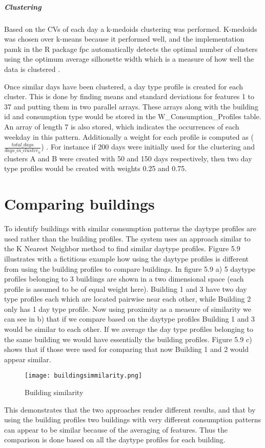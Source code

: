 \subparagraph{Clustering}Based on the CVs of each day a k-medoids clustering was performed. K-medoids was chosen over k-means because it performed well, and the implementation pamk in the R package fpc automatically detects the optimal number of clusters using the optimum average silhouette width which is a measure of how well the data is clustered \cite{PeterJRousseeuw}. 

Once similar days have been clustered, a day type profile is created for each cluster. This is done by finding means and standard deviations for features 1 to 37 and putting them in two parallel arrays. These arrays along with the building id and consumption type would be stored in the W\_Consumption\_Profiles table. An array of length 7 is also stored, which indicates the occurrences of each weekday in this pattern. Additionally a weight for each profile is computed as ($\frac{total\_days}{days\_in\_cluster_n}$)	. For instance if 200 days were initially used for the clustering and clusters A and B were created with 50 and 150 days respectively, then two day type profiles would be created with weights 0.25 and 0.75.
\section{Comparing buildings}
To identify buildings with similar consumption patterns the daytype profiles are used rather than the building profiles. The system uses an approach similar to the K Nearest Neighbor method to find similar daytype profiles. Figure 5.9 illustrates with a fictitious example how using the daytype profiles is different from using the building profiles to compare buildings. In figure 5.9 a) 5 daytype profiles belonging to 3 buildings are shown in a two dimensional space (each profile is assumed to be of equal weight here). Building 1 and 3 have two day type profiles each which are located pairwise near each other, while Building 2 only has 1 day type profile. Now using proximity as a measure of similarity we can see in b) that if we compare based on the daytype profiles Building 1 and 3 would be similar to each other. If we average the day type profiles belonging to the same building we would have essentially the building profiles. Figure 5.9 c) shows that if those were used for comparing that now Building 1 and 2 would appear similar. 
\begin{figure}
\begin{center}
\texttt{[image: buildingsimmilarity.png]}
\end{center}
\caption{Building similarity}
\end{figure}
This demonstrates that the two approaches render different results, and that by using the building profiles two buildings with very different consumption patterns can appear to be similar because of the averaging of features. Thus the comparison is done based on all the daytype profiles for each building.

